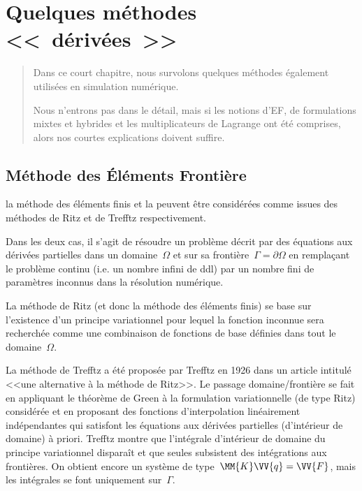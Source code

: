 \chapter{Quelques méthodes <<~dérivées~>>}\label{Ch-XFEM}
\begin{abstract}
Dans ce court chapitre, nous survolons quelques méthodes également utilisées
en simulation numérique.

Nous n'entrons pas dans le détail, mais si les notions d'EF, de formulations
mixtes et hybrides et les multiplicateurs de Lagrange ont été comprises, alors nos courtes
explications doivent suffire.
\end{abstract}


\medskip
\section{Méthode des Éléments Frontière}\label{Sec-BEM}

la méthode des éléments finis et la  
peuvent être
considérées comme issues des méthodes de Ritz 
et de Trefftz respectivement.

Dans les deux cas, il s'agit de résoudre un problème décrit par des équations aux dérivées partielles dans un
domaine~$\Omega$ et sur sa frontière~$\Gamma=\partial\Omega$ en remplaçant
le problème continu (i.e. un nombre infini de ddl) par un nombre fini de paramètres inconnus 
dans la résolution numérique.

\medskip
La méthode de Ritz (et donc la méthode des éléments finis) se base sur 
l'existence d'un principe variationnel pour lequel la fonction inconnue sera recherchée comme une 
combinaison de fonctions de base définies dans tout le domaine~$\Omega$.

\medskip
La méthode de Trefftz a été proposée 
par Trefftz en 1926 dans un article intitulé <<une alternative à la méthode de Ritz>>. 
Le passage domaine/frontière se fait en appliquant le théorème de Green 
à la formulation variationnelle (de type Ritz) 
considérée et en proposant des fonctions d'interpolation linéairement indépendantes
qui satisfont les équations aux dérivées partielles (d'intérieur de domaine) à priori.
Trefftz montre que l'intégrale d'intérieur de domaine du principe variationnel disparaît et que
seules subsistent des intégrations aux frontières. 
On obtient encore un système de type~$\MM{K}\VV{q}=\VV{F}$, mais les intégrales se font uniquement
sur~$\Gamma$.


